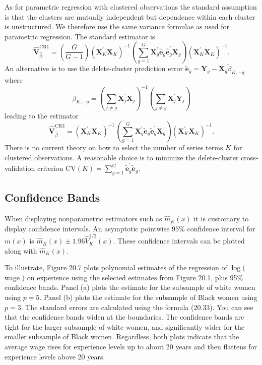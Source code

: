 \documentclass[10pt]{article}
\begin{document}
As for parametric regression with clustered observations the standard assumption is that the clusters are mutually independent but dependence within each cluster is unstructured. We therefore use the same variance formulae as used for parametric regression. The standard estimator is
$$
\widehat{\boldsymbol{V}}_{\widehat{\beta}}^{\mathrm{CR1}}=\left(\frac{G}{G-1}\right)\left(\boldsymbol{X}_{K}^{\prime} \boldsymbol{X}_{K}\right)^{-1}\left(\sum_{g=1}^{G} \boldsymbol{X}_{g}^{\prime} \widehat{\boldsymbol{e}}_{g} \widehat{\boldsymbol{e}}_{g}^{\prime} \boldsymbol{X}_{g}\right)\left(\boldsymbol{X}_{K}^{\prime} \boldsymbol{X}_{K}\right)^{-1} .
$$
An alternative is to use the delete-cluster prediction error $\widetilde{\boldsymbol{e}}_{g}=\boldsymbol{Y}_{g}-\boldsymbol{X}_{g} \widetilde{\beta}_{K,-g}$ where
$$
\widetilde{\beta}_{K,-g}=\left(\sum_{j \neq g} \boldsymbol{X}_{j}^{\prime} \boldsymbol{X}_{j}\right)^{-1}\left(\sum_{j \neq g} \boldsymbol{X}_{j}^{\prime} \boldsymbol{Y}_{j}\right)
$$
leading to the estimator
$$
\widehat{\boldsymbol{V}}_{\widehat{\beta}}^{\mathrm{CR} 3}=\left(\boldsymbol{X}_{K}^{\prime} \boldsymbol{X}_{K}\right)^{-1}\left(\sum_{g=1}^{G} \boldsymbol{X}_{g}^{\prime} \widetilde{\boldsymbol{e}}_{g} \widetilde{\boldsymbol{e}}_{g}^{\prime} \boldsymbol{X}_{g}\right)\left(\boldsymbol{X}_{K}^{\prime} \boldsymbol{X}_{K}\right)^{-1} .
$$
There is no current theory on how to select the number of series terms $K$ for clustered observations. A reasonable choice is to minimize the delete-cluster cross-validation criterion $\mathrm{CV}(K)=\sum_{g=1}^{G} \widetilde{\boldsymbol{e}}_{g}^{\prime} \widetilde{\boldsymbol{e}}_{g}$.

\subsection{Confidence Bands}
When displaying nonparametric estimators such as $\widehat{m}_{K}(x)$ it is customary to display confidence intervals. An asymptotic pointwise $95 \%$ confidence interval for $m(x)$ is $\widehat{m}_{K}(x) \pm 1.96 \widehat{V}_{K}^{1 / 2}(x)$. These confidence intervals can be plotted along with $\widehat{m}_{K}(x)$.

To illustrate, Figure $20.7$ plots polynomial estimates of the regression of $\log ($ wage $)$ on experience using the selected estimates from Figure 20.1, plus 95\% confidence bands. Panel (a) plots the estimate for the subsample of white women using $p=5$. Panel (b) plots the estimate for the subsample of Black women using $p=3$. The standard errors are calculated using the formula (20.33). You can see that the confidence bands widen at the boundaries. The confidence bands are tight for the larger subsample of white women, and significantly wider for the smaller subsample of Black women. Regardless, both plots indicate that the average wage rises for experience levels up to about 20 years and then flattens for experience levels above 20 years.
\end{document}
